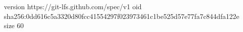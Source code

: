 version https://git-lfs.github.com/spec/v1
oid sha256:0dd616c5a3320d80fcc41554297f023973461c1be525d57e77fa7c844dfa122e
size 60
